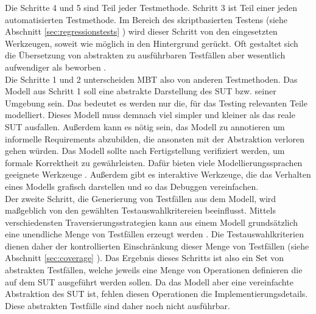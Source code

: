 Die Schritte 4 und 5 sind Teil jeder Testmethode. Schritt 3 ist Teil einer jeden automatisierten Testmethode. Im Bereich des skriptbasierten Testens (siehe Abschnitt \ref{sec:regressionstests} ) wird dieser Schritt von den eingesetzten Werkzeugen, soweit wie möglich in den Hintergrund gerückt. Oft gestaltet sich die Übersetzung von abstrakten zu ausführbaren Testfällen aber wesentlich aufwendiger als beworben \cite{graham_experiences_2012}.\\
Die Schritte 1 und 2 unterscheiden \Gls{MBT} also von anderen Testmethoden. Das Modell aus Schritt 1 soll eine abstrakte Darstellung des \Gls{SUT} bzw. seiner Umgebung sein. Das bedeutet es werden nur die, für das Testing relevanten Teile modelliert. Dieses Modell muss demnach viel simpler und kleiner als das reale \Gls{SUT} ausfallen. Außerdem kann es nötig sein, das Modell zu annotieren um informelle Requirements abzubilden, die ansonsten mit der Abstraktion verloren gehen würden. Das Modell sollte nach Fertigstellung verifiziert werden, um formale Korrektheit zu gewährleisten. Dafür bieten viele Modellierungssprachen geeignete Werkzeuge \cite{kaneiwa_consistency_2006}. Außerdem gibt es interaktive Werkzeuge, die das Verhalten eines Modells grafisch darstellen und so das Debuggen vereinfachen.\\
Der zweite Schritt, die Generierung von Testfällen aus dem Modell, wird maßgeblich von den gewählten Testauswahlkritereien beeinflusst. Mittels verschiedensten Traversierungsstrategien kann aus einem Modell grundsätzlich eine unendliche Menge von Testfällen erzeugt werden \cite{utting_practical_2007}. Die Testauswahlkriterien dienen daher der kontrollierten Einschränkung dieser Menge von Testfällen (siehe Abschnitt \ref{sec:coverage} ). Das Ergebnis dieses Schritts ist also ein Set von abstrakten Testfällen, welche jeweils eine Menge von Operationen definieren die auf dem \Gls{SUT} ausgeführt werden sollen. Da das Modell aber eine vereinfachte Abstraktion des \Gls{SUT} ist, fehlen diesen Operationen die Implementierungsdetails. Diese abstrakten Testfälle sind daher noch nicht ausführbar.\\

